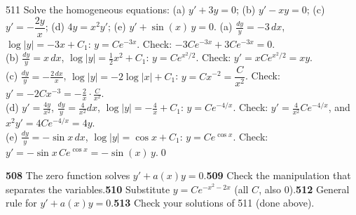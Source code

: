 \begin{bookex}{511}
Solve the homogeneous equations: (a) $y'+3y=0$; (b) $y'-xy=0$; (c) $y'=-\dfrac{2y}x$; (d) $4y=x^2y'$; (e) $y'+\sin(x)\,y=0$.
\solution
(a) $\frac{dy}y=-3\,dx$, $\log|y|=-3x+C_1$: $y=Ce^{-3x}$. Check: $-3Ce^{-3x}+3Ce^{-3x}=0$.\\
(b) $\frac{dy}y=x\,dx$, $\log|y|=\frac12x^2+C_1$: $y=Ce^{x^2/2}$. Check: $y'=xCe^{x^2/2}=xy$.\\
(c) $\frac{dy}y=-\frac{2\,dx}x$, $\log|y|=-2\log|x|+C_1$: $y=Cx^{-2}=\dfrac C{x^2}$. Check: $y'=-2Cx^{-3}=-\frac2x\cdot\frac C{x^2}$.\\
(d) $y'=\frac{4y}{x^2}$, $\frac{dy}y=\frac4{x^2}dx$, $\log|y|=-\frac4x+C_1$: $y=Ce^{-4/x}$. Check: $y'=\frac4{x^2}Ce^{-4/x}$, and $x^2y'=4Ce^{-4/x}=4y$.\\
(e) $\frac{dy}y=-\sin x\,dx$, $\log|y|=\cos x+C_1$: $y=Ce^{\cos x}$. Check: $y'=-\sin x\,Ce^{\cos x}=-\sin(x)\,y$.\qed
\end{bookex}

\begin{trybox}[{508, 509, 510, 512, 513}]
\textbf{508} The zero function solves $y'+a(x)y=0$.\quad \textbf{509} Check the manipulation that separates the variables.\quad \textbf{510} Substitute $y=Ce^{-x^2-2x}$ (all $C$, also $0$).\quad \textbf{512} General rule for $y'+a(x)y=0$.\quad \textbf{513} Check your solutions of 511 (done above).
\end{trybox}


